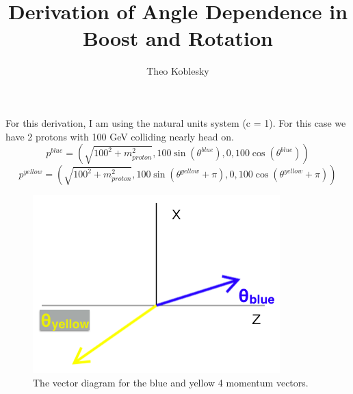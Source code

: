 \documentclass[12pt,oneside,openary]{article}
\begin{document}
\title{Derivation of Angle Dependence in Boost and Rotation}
\author{Theo Koblesky}
\maketitle

For this derivation, I am using the natural units system (c = 1). For this case we have 2 protons with 100 GeV colliding nearly head on.
\begin{equation}
p^{blue} = \left(\sqrt{100^2+m_{proton}^2},100\sin(\theta^{blue}),0,100\cos(\theta^{blue})\right) 
\end{equation}
\begin{equation}
p^{yellow} = \left(\sqrt{100^2+m_{proton}^2},100 \sin(\theta^{yellow}+\pi),0,100 \cos(\theta^{yellow}+\pi)\right) 
\end{equation}

\begin{figure}[h!]
\begin{center}
\includegraphics[width=0.45\linewidth]{vector_diagram.png}
\caption{The vector diagram for the blue and yellow 4 momentum vectors.}
\label{fig:diagram2}
\end{center}
\end{figure}
\end{document}
